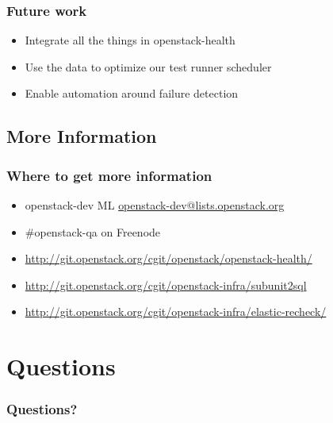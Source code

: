 \documentclass[aspectratio=43,11pt,hyperref={colorlinks=true}]{beamer}
\begin{document}
\begin{frame}
    \frametitle{Future work}
    \begin{itemize}
        \item Integrate all the things in openstack-health
        \item Use the data to optimize our test runner scheduler
        \item Enable automation around failure detection
    \end{itemize}
\end{frame}

\subsection{More Information}
\begin{frame}
\frametitle{Where to get more information}
    \begin{itemize}
        \item openstack-dev ML\: \href{mailto:openstack-dev@lists.openstack.org}{openstack-dev@lists.openstack.org}
        \item \#openstack-qa on Freenode
        \item \href{http://git.openstack.org/cgit/openstack/openstack-health/}{http://git.openstack.org/cgit/openstack/openstack-health/}
        \item \href{http://git.openstack.org/cgit/openstack-infra/subunit2sql}{http://git.openstack.org/cgit/openstack-infra/subunit2sql}
        \item \href{http://git.openstack.org/cgit/openstack-infra/elastic-recheck/}{http://git.openstack.org/cgit/openstack-infra/elastic-recheck/}
    \end{itemize}
\end{frame}

\section{Questions}
\begin{frame}
\frametitle{Questions?}
\end{frame}
\end{document}
